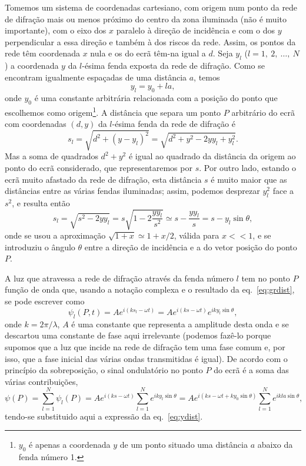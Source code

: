 Tomemos um sistema de coordenadas cartesiano, com origem num ponto da rede de
difração mais ou menos próximo do centro da zona iluminada (não é muito
importante), com o eixo dos $x$ paralelo à direção de incidência e com o dos $y$
perpendicular a essa direção e também à dos riscos da rede. Assim, os pontos da
rede têm coordenada $x$ nula e os do ecrã têm-na igual a $d$. Seja $y_l$ ($l=1,\
2,\ \ldots,\ N$) a coordenada $y$ da $l$-ésima fenda exposta da rede de
difração.  Como se encontram igualmente espaçadas de uma distância $a$, temos
\begin{equation}\label{eq:ydist}
  y_l = y_0+la,
\end{equation}
onde $y_0$ é uma constante arbitrária relacionada com a posição do ponto que
escolhemos como origem\footnote{$y_0$ é apenas a coordenada $y$ de um ponto
  situado uma distância $a$ abaixo da fenda número 1.}. A distância que separa
um ponto $P$ arbitrário do ecrã com coordenadas $(d,y)$ da $l$-ésima fenda da
rede de difração é
\begin{equation*}
  s_l=\sqrt{d^2+(y-y_l)^2}=\sqrt{d^2 + y^2 - 2yy_l+y_l^2}.
\end{equation*}
Mas a soma de quadrados $d^2+y^2$ é igual ao quadrado da distância da origem ao
ponto do ecrã considerado, que representaremos por $s$. Por outro lado, estando o
ecrã muito afastado da rede de difração, esta distância $s$ é muito maior que as
distâncias entre as várias fendas iluminadas; assim, podemos desprezar $y_l^2$
face a $s^2$, e resulta então
\begin{equation}\label{eq:grdist}
  s_l=\sqrt{s^2-2yy_l}=s\sqrt{1-2\frac{yy_l}{s^2}}\simeq
  s-\frac{yy_l}{s}=s-y_l\sin\theta,
\end{equation}
onde se usou a aproximação $\sqrt{1+x}\simeq1+x/2$, válida para $x<<1$, e se
introduziu o ângulo $\theta$ entre a direção de incidência e a do
vetor posição do ponto $P$.

A luz que atravessa a rede de difração através da fenda número $l$ tem no ponto
$P$ função de onda que, usando a notação complexa e o resultado da
eq.~\eqref{eq:grdist}, se pode escrever como
\begin{equation*}
  \psi_l(P,t) = Ae^{i(ks_l-\omega t)}=Ae^{i(ks-\omega t)}
  e^{iky_l\sin\theta},
\end{equation*}
onde $k=2\pi/\lambda$, $A$ é uma constante que representa a amplitude desta
onda e se descartou uma constante de fase aqui irrelevante (podemos fazê-lo
porque supomos que a luz que incide na rede de difração tem uma fase comum e,
por isso, que a fase inicial das várias ondas transmitidas é igual). De acordo
com o princípio da sobreposição, o sinal ondulatório no ponto $P$ do ecrã é a
soma das várias contribuições,
\begin{equation}\label{eq:grtsuperp}
  \psi(P)=\sum_{l=1}^N\psi_l(P) =
    Ae^{i(ks-\omega t)} \sum_{l=1}^Ne^{iky_l\sin\theta}=
    Ae^{i(ks-\omega t+ky_0\sin\theta)}\sum_{l=1}^Ne^{ikla\sin\theta},
\end{equation}
tendo-se substituido aqui a expressão da eq.~\eqref{eq:ydist}. 

